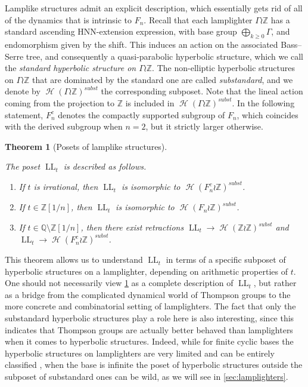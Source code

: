 \documentclass[reqno,12pt]{amsart}\setcounter{tocdepth}{1}
\newtheorem{thmA}{Theorem}
\theoremstyle{definition}
\newcommand{\Z}{\mathbb{Z}}
\newcommand{\Q}{\mathbb{Q}}
\DeclareMathOperator{\Hyp}{\mathcal{H}}
\DeclareMathOperator{\LL}{LL}
\numberwithin{equation}{section}
\begin{document}
Lamplike structures admit an explicit description, which essentially gets rid of all of the dynamics that is intrinsic to $F_n$. Recall that each lamplighter $\Gamma \wr \Z$ has a standard ascending HNN-extension expression, with base group $\bigoplus_{k \geq 0} \Gamma$, and endomorphism given by the shift. This induces an action on the associated Bass--Serre tree, and consequently a quasi-parabolic hyperbolic structure, which we call the \emph{standard hyperbolic structure on $\Gamma \wr \Z$}. The non-elliptic hyperbolic structures on $\Gamma \wr \Z$ that are dominated by the standard one are called \emph{substandard}, and we denote by $\Hyp(\Gamma \wr \Z)^{subst}$ the corresponding subposet. Note that the lineal action coming from the projection to $\Z$ is included in $\Hyp(\Gamma \wr \Z)^{subst}$. In the following statement, $F_n^c$ denotes the compactly supported subgroup of $F_n$, which coincides with the derived subgroup when $n = 2$, but it strictly larger otherwise.

\begin{thmA}[Posets of lamplike structures]
\label{intro:thm:lamplike}

The poset $\LL_t$ is described as follows.
\begin{enumerate}
	\item If $t$ is irrational, then $\LL_t$ is isomorphic to $\Hyp(F_n^c \wr \Z)^{subst}$. 
	\item If $t \in \Z[1/n]$, then $\LL_t$ is isomorphic to $\Hyp(F_n \wr \Z)^{subst}$.
	\item If $t \in \Q \setminus \Z[1/n]$, then there exist retractions $\LL_t \to \Hyp(\Z \wr \Z)^{subst}$ and $\LL_t \to \Hyp(F_n^c \wr \Z)^{subst}$.
\end{enumerate}
\end{thmA}

This theorem allows us to understand $\LL_t$ in terms of a specific subposet of hyperbolic structures on a lamplighter, depending on arithmetic properties of $t$. One should not necessarily view \cref{intro:thm:lamplike} as a complete description of $\LL_t$, but rather as a bridge from the complicated dynamical world of Thompson groups to the more concrete and combinatorial setting of lamplighters. The fact that only the substandard hyperbolic structures play a role here is also interesting, since this indicates that Thompson groups are actually better behaved than lamplighters when it comes to hyperbolic structures. Indeed, while for finite cyclic bases the hyperbolic structures on lamplighters are very limited and can be entirely classified \cite{sahana:wreath}, when the base is infinite the poset of hyperbolic structures outside the subposet of substandard ones can be wild, as we will see in \cref{sec:lamplighters}.
\end{document}
